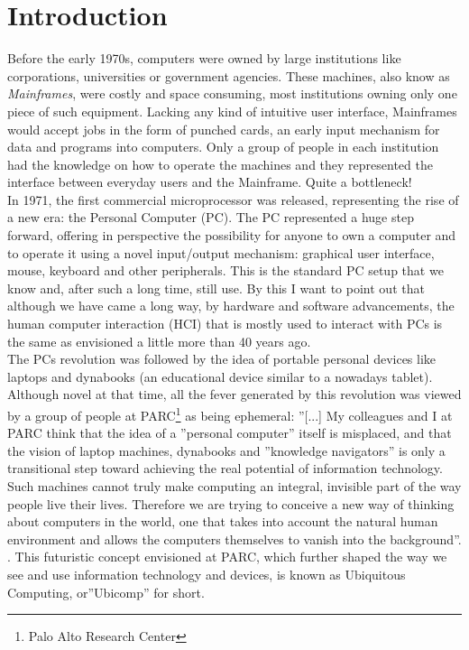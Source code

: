 \chapter{Introduction}\label{ch:introduction}

Before the early 1970s, computers were owned by large institutions like corporations, universities or government agencies. These machines, also know as \emph{Mainframes}, were costly and space consuming, most institutions owning only one piece of such equipment. Lacking any kind of intuitive user interface, Mainframes would accept jobs in the form of punched cards, an early input mechanism for data and programs into computers. Only a group of people in each institution had the knowledge on how to operate the machines and they represented the interface between everyday users and the Mainframe. Quite a bottleneck!\\

In 1971, the first commercial microprocessor was released, representing the rise of a new era: the Personal Computer (PC). The PC represented a huge step forward, offering in perspective the possibility for anyone to own a computer and to operate it using a novel input/output mechanism: graphical user interface, mouse, keyboard and other peripherals. This is the standard PC setup that we know and, after such a long time, still use. By this I want to point out that although we have came a long way, by hardware and software advancements, the human computer interaction (HCI) that is mostly used to interact with PCs is the same as envisioned a little more than 40 years ago.\\

The PCs revolution was followed by the idea of portable personal devices like laptops and dynabooks (an educational device similar to a nowadays tablet). Although novel at that time, all the fever generated by this revolution was viewed by a group of people at PARC\footnote{Palo Alto Research Center} as being ephemeral: ''[...] My colleagues and I at PARC think that the idea of a ''personal computer'' itself is misplaced, and that the vision of laptop machines, dynabooks and ''knowledge navigators'' is only a transitional step toward achieving the real potential of information technology. Such machines cannot truly make computing an integral, invisible part of the way people live their lives. Therefore we are trying to conceive a new way of thinking about computers in the world, one that takes into account the natural human environment and allows the computers themselves to vanish into the background''. \cite{weiser1991computer}. This futuristic concept envisioned at PARC, which further shaped the way we see and use information technology and devices, is known as Ubiquitous Computing, or''Ubicomp'' for short.\\


